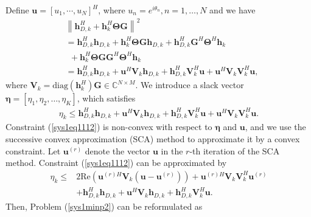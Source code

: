 \documentclass[journal]{IEEEtran}
\begin{document}
Define $\pmb u=[u_1, \cdots, u_N]^H$, where $u_n=e^{i\theta_{n}}, n=1,\dots,N$ and we have
{\begin{align}
&\left\|\pmb h^H_{D,k}+\pmb h_{k}^H \pmb \Theta \pmb G\right\|^2\\\nonumber
&= \pmb h^H_{D,k}\pmb h_{D,k}+\pmb h_{k}^H \pmb \Theta \pmb G\pmb h_{D,k}+\pmb h_{D,k}^H\pmb G^H\pmb \Theta^H\pmb h_{k}\\\nonumber&~~+\pmb h_{k}^H \pmb \Theta \pmb G\pmb G^H\pmb \Theta^H\pmb h_{k}\\\nonumber
&=\pmb h^H_{D,k}\pmb h_{D,k}+\pmb u^H\pmb V_k\pmb h_{D,k}+\pmb h^H_{D,k}\pmb V_k^H\pmb u+\pmb u^H\pmb V_k\pmb V_k^H\pmb u,
\end{align}
where $\pmb V_k=\text{diag}(\pmb h_{k}^H)\pmb G \in \mathbb C^{N\times M} $.}
We introduce a slack vector $\pmb \eta=[\eta_1,\eta_2,\dots,\eta_K]$, which satisfies
\begin{align}\label{sys1eq1112}
{\eta_k\leq\pmb h^H_{D,k}\pmb h_{D,k}+\pmb u^H\pmb V_k\pmb h_{D,k}+\pmb h^H_{D,k}\pmb V_k^H\pmb u+\pmb u^H\pmb V_k\pmb V_k^H\pmb u.}
\end{align}
Constraint (\ref{sys1eq1112}) is non-convex with respect to $\pmb\eta$ and $\pmb u$, and we use the successive convex approximation (SCA) method to approximate it by a convex constraint. Let
$\pmb u^{(r)}$ denote the vector $\pmb u$ in the $r$-th iteration of
the SCA method. Constraint (\ref{sys1eq1112}) can be approximated by
{\begin{align}\label{sys1eq1113}
\eta_k\leq& 2\text{Re}\left(\pmb u^{(r)H}\pmb V_k\left(\pmb u-\pmb u^{(r)}\right)\right)+\pmb u^{(r)H}\pmb V_k\pmb V_k^H\pmb u^{(r)}\\\nonumber
&+\pmb h^H_{D,k}\pmb h_{D,k}+\pmb u^H\pmb V_k\pmb h_{D,k}+\pmb h^H_{D,k}\pmb V_k^H\pmb u.
\end{align}}
Then, Problem (\ref{sys1minp2}) can be reformulated as
\end{document}
